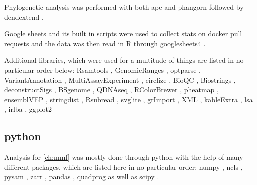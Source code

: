 {Phylogenetic analysis was performed with both ape \cite{Paradis2018} and phangorn \cite{Schliep2017} followed by dendextend \cite{Galili2015}.

Google sheets and its built in scripts were used to collect stats on docker pull requests and the data was then read in R through googlesheets4 \cite{Bryan2021}.

Additional libraries, which were used for a multitude of things are listed in no particular order below: Rsamtools \cite{Morgan2021}, GenomicRanges \cite{Lawrence2013}, optparse \cite{Davis2020}, VariantAnnotation \cite{Obenchain2014}, MultiAssayExperiment \cite{Ramos2017}, circlize \cite{Gu2014}, BioQC \cite{Zhang2017}, Biostrings \cite{Pages2020}, deconstructSigs \cite{Rosenthal2016}, BSgenome \cite{Pages2020a}, QDNAseq \cite{Scheinin2014}, RColorBrewer \cite{Neuwirth2014}, pheatmap \cite{Kolde2019}, ensemblVEP \cite{Obenchain2020}, stringdist \cite{vanderLoo2014}, Rsubread \cite{Liao2019}, svglite \cite{Wickham2021}, grImport \cite{Murrell2009}, XML \cite{TempleLang2020}, kableExtra \cite{Zhu2021}, lsa \cite{Wild2020}, irlba \cite{Baglama2019}, ggplot2 \cite{Wickham2016}


\subsection{python}
Analysis for \autoref{ch:mmf} was mostly done through python \cite{VanRossum2010} with the help of many different packages, which are listed here in no particular order: numpy \cite{Harris2020}, ncls \cite{Stovner2019}, pysam \cite{Heger2021,Bonfield2021,Danecek2021}, zarr \cite{Miles2021}, pandas \cite{McKinney2010,Reback2021}, quadprog \cite{McGibbon2021} as well as scipy \cite{Virtanen2020}.

}
